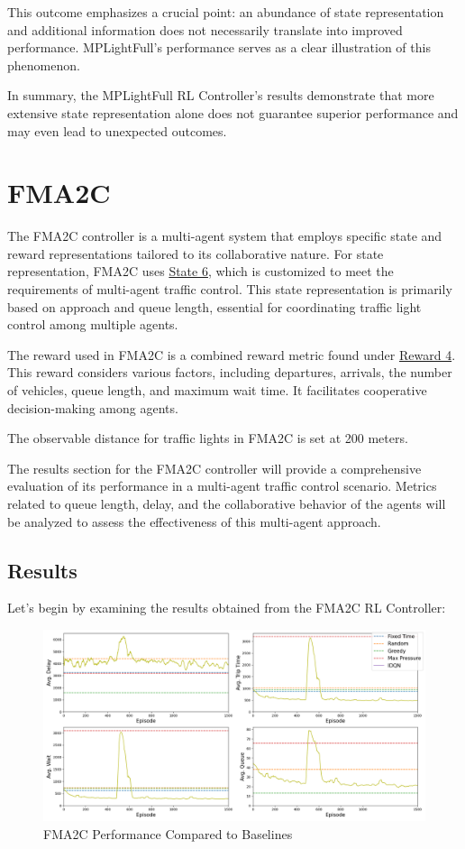 This outcome emphasizes a crucial point: an abundance of state representation and additional information does not necessarily translate into improved performance. MPLightFull's performance serves as a clear illustration of this phenomenon.

In summary, the MPLightFull RL Controller's results demonstrate that more extensive state representation alone does not guarantee superior performance and may even lead to unexpected outcomes.

\section{FMA2C} \label{sec:exp-fma2c}
The FMA2C controller is a multi-agent system that employs specific state and reward representations tailored to its collaborative nature. For state representation, FMA2C uses \hyperref[subsec:state-6]{State 6}, which is customized to meet the requirements of multi-agent traffic control. This state representation is primarily based on approach and queue length, essential for coordinating traffic light control among multiple agents.

The reward used in FMA2C is a combined reward metric found under \hyperref[subsec:reward-4]{Reward 4}. This reward considers various factors, including departures, arrivals, the number of vehicles, queue length, and maximum wait time. It facilitates cooperative decision-making among agents.

The observable distance for traffic lights in FMA2C is set at 200 meters.

The results section for the FMA2C controller will provide a comprehensive evaluation of its performance in a multi-agent traffic control scenario. Metrics related to queue length, delay, and the collaborative behavior of the agents will be analyzed to assess the effectiveness of this multi-agent approach.

\subsection{Results}
Let's begin by examining the results obtained from the FMA2C RL Controller:

\begin{figure}[h]
    \centering
    \includegraphics[width=1\linewidth]{images/experiments/FMA2C.png}
    \caption{FMA2C Performance Compared to Baselines}
    \label{fig:fama2c_results}
\end{figure}


